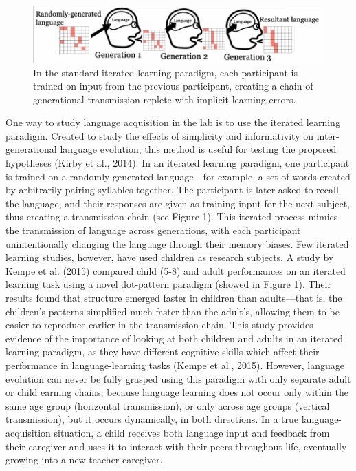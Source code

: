\documentclass[10pt, letterpaper]{article}
\newenvironment{CodeChunk}{}{}
\begin{document}
\begin{CodeChunk}
\begin{figure}[tb]

{\centering \includegraphics{figs/ill_outline-1} 

}

\caption[In the standard iterated learning paradigm, each participant is trained on input from the previous participant, creating a chain of generational transmission replete with implicit learning errors]{In the standard iterated learning paradigm, each participant is trained on input from the previous participant, creating a chain of generational transmission replete with implicit learning errors.}\label{fig:ill_outline}
\end{figure}
\end{CodeChunk}

One way to study language acquisition in the lab is to use the iterated
learning paradigm. Created to study the effects of simplicity and
informativity on inter-generational language evolution, this method is
useful for testing the proposed hypotheses (Kirby et al., 2014). In an
iterated learning paradigm, one participant is trained on a
randomly-generated language---for example, a set of words created by
arbitrarily pairing syllables together. The participant is later asked
to recall the language, and their responses are given as training input
for the next subject, thus creating a transmission chain (see Figure 1).
This iterated process mimics the transmission of language across
generations, with each participant unintentionally changing the language
through their memory biases. Few iterated learning studies, however,
have used children as research subjects. A study by Kempe et al. (2015)
compared child (5-8) and adult performances on an iterated learning task
using a novel dot-pattern paradigm (showed in Figure 1). Their results
found that structure emerged faster in children than adults---that is,
the children's patterns simplified much faster than the adult's,
allowing them to be easier to reproduce earlier in the transmission
chain. This study provides evidence of the importance of looking at both
children and adults in an iterated learning paradigm, as they have
different cognitive skills which affect their performance in
language-learning tasks (Kempe et al., 2015). However, language
evolution can never be fully grasped using this paradigm with only
separate adult or child earning chains, because language learning does
not occur only within the same age group (horizontal transmission), or
only across age groups (vertical transmission), but it occurs
dynamically, in both directions. In a true language-acquisition
situation, a child receives both language input and feedback from their
caregiver and uses it to interact with their peers throughout life,
eventually growing into a new teacher-caregiver.
\end{document}
